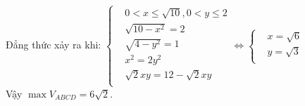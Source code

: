 \begin{ex}
{		Đẳng thức xảy ra khi: $\left\{\begin{aligned}
			& 0<x\le\sqrt{10},0<y\le 2\\ 
			&\sqrt{10-x^2}=2\\ 
			&\sqrt{4-y^2}=1\\ 
			&{x^2}=2y^2\\ 
			&\sqrt{2}xy=12-\sqrt{2}xy\\ 
		\end{aligned}\right.\Leftrightarrow\left\{\begin{aligned}
			& x=\sqrt{6}\\ 
			& y=\sqrt{3}\\ 
		\end{aligned}\right.$\\
		Vậy $\max{V_{ABCD}}=6\sqrt{2}$.
	}
\end{ex}
